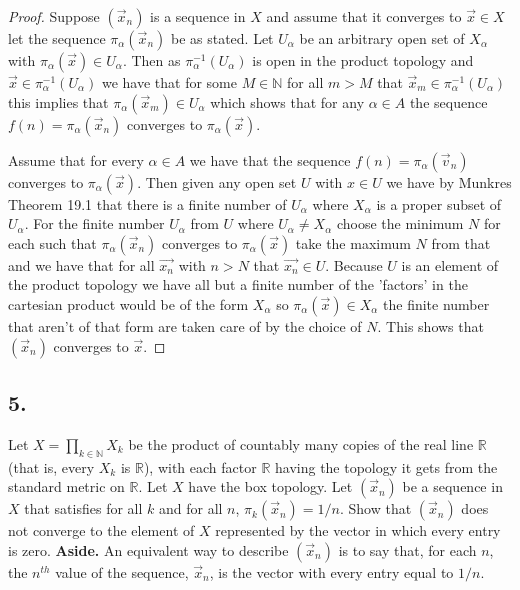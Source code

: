 \documentclass{amsart}
\theoremstyle{plain}
\theoremstyle{definition}
\theoremstyle{remark}
\begin{document}
\begin{proof}
    Suppose $(\vec{x}_n)$ is a sequence in $X$ and assume that it converges to $\vec{x}\in X$ let the sequence $\pi_\alpha(\vec{x}_n)$ be as stated. Let $U_\alpha$ be an arbitrary open set of $X_\alpha$ with $\pi_\alpha(\vec{x})\in U_\alpha$. Then as $\pi_\alpha^{-1}(U_\alpha)$ is open in the product topology and $\vec{x} \in \pi_\alpha^{-1}(U_\alpha)$ we have that for some $M\in \mathbb{N}$ for all $m>M$  that $\vec x_m\in \pi_\alpha^{-1}(U_\alpha)$ this implies that $\pi_\alpha(\vec x_m) \in U_\alpha$  which shows that for any $\alpha \in A$ the sequence $f(n)=\pi_\alpha(\vec{x}_n)$ converges to $\pi_\alpha(\vec{x})$.
    
    Assume that for every $\alpha\in A$ we have that the sequence $f(n)=\pi_\alpha(\vec v_n)$ converges to $\pi_{\alpha}(\vec x)$. Then given any open set $U$ with $x\in U$ we have by Munkres Theorem 19.1 that there is a finite number of $U_\alpha$ where $X_\alpha$ is a proper subset of $U_\alpha$. For the finite number $U_\alpha$ from $U$ where $U_\alpha\not = X_\alpha$ choose the minimum $N$ for each such that $\pi_\alpha(\vec{x}_n)$ converges to $\pi_\alpha(\vec{x})$ take the maximum $N$ from that and we have that for all $\vec{x_n}$ with $n>N$ that $\vec{x_n}\in U$. Because $U$ is an element of the product topology we have all but a finite number of the 'factors' in the cartesian product would be of the form $X_\alpha$ so $\pi_\alpha(\vec{x})\in X_\alpha$ the finite number that aren't of that form are taken care of by the choice of $N$. This shows that $(\vec x_n)$ converges to $\vec x$.
\end{proof}


\vspace{.15in}

\noindent
\subsection*{5.} Let $X =\prod _{k\in \mathbb N} X_k$ be the product of countably many copies of the real line $\mathbb R$  (that is, every $X_k$ is $\mathbb R$), with each factor $\mathbb R$ having the topology it gets from the standard metric on $\mathbb R$. Let $X$ have the box topology. Let $(\vec{x}_n)$ be a sequence in $X$ that satisfies for all $k$ and for all $n$, $\pi_k  (\vec{x}_n) = 1/n$. Show that $(\vec{x}_n)$ does not converge to the element of $X$ represented by the vector in which every entry is zero. {\bfseries Aside.} An equivalent way to describe $(\vec{x}_n)$ is to say that, for each $n$, the $n^{th}$ value of the sequence, $\vec{x}_n$, is the vector with every entry equal to $1/n$.
\end{document}
